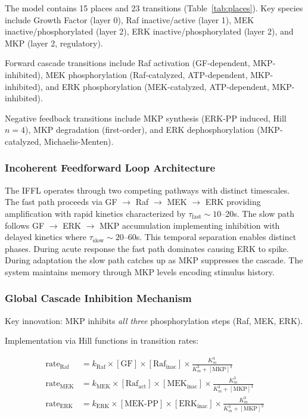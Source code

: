 \documentclass[twocolumn,11pt]{article}
\newcommand{\erk}{ERK}
\newcommand{\mkp}{MKP}
\begin{document}
The model contains 15 places and 23 transitions (Table~\ref{tab:places}). Key species include Growth Factor (layer 0), Raf inactive/active (layer 1), MEK inactive/phosphorylated (layer 2), \erk{} inactive/phosphorylated (layer 2), and \mkp{} (layer 2, regulatory).

Forward cascade transitions include Raf activation (GF-dependent, \mkp{}-inhibited), MEK phosphorylation (Raf-catalyzed, ATP-dependent, \mkp{}-inhibited), and \erk{} phosphorylation (MEK-catalyzed, ATP-dependent, \mkp{}-inhibited).

Negative feedback transitions include \mkp{} synthesis (\erk{}-PP induced, Hill $n=4$), \mkp{} degradation (first-order), and \erk{} dephosphorylation (\mkp{}-catalyzed, Michaelis-Menten).

\subsubsection{Incoherent Feedforward Loop Architecture}

The IFFL operates through two competing pathways with distinct timescales. The fast path proceeds via GF $\to$ Raf $\to$ MEK $\to$ \erk{} providing amplification with rapid kinetics characterized by $\tau_{\text{fast}} \sim 10$--20s. The slow path follows GF $\to$ \erk{} $\to$ \mkp{} accumulation implementing inhibition with delayed kinetics where $\tau_{\text{slow}} \sim 20$--60s. This temporal separation enables distinct phases. During acute response the fast path dominates causing \erk{} to spike. During adaptation the slow path catches up as \mkp{} suppresses the cascade. The system maintains memory through \mkp{} levels encoding stimulus history.

\subsubsection{Global Cascade Inhibition Mechanism}

Key innovation: \mkp{} inhibits \textit{all three} phosphorylation steps (Raf, MEK, \erk{}).

Implementation via Hill functions in transition rates:

\begin{align}
\text{rate}_{\text{Raf}} &= k_{\text{Raf}} \times [\text{GF}] \times [\text{Raf}_{\text{inac}}] \times \frac{K_m^3}{K_m^3 + [\text{MKP}]^3} \\
\text{rate}_{\text{MEK}} &= k_{\text{MEK}} \times [\text{Raf}_{\text{act}}] \times [\text{MEK}_{\text{inac}}] \times \frac{K_m^3}{K_m^3 + [\text{MKP}]^3} \\
\text{rate}_{\text{ERK}} &= k_{\text{ERK}} \times [\text{MEK-PP}] \times [\text{ERK}_{\text{inac}}] \times \frac{K_m^3}{K_m^3 + [\text{MKP}]^3}
\end{align}
\end{document}
